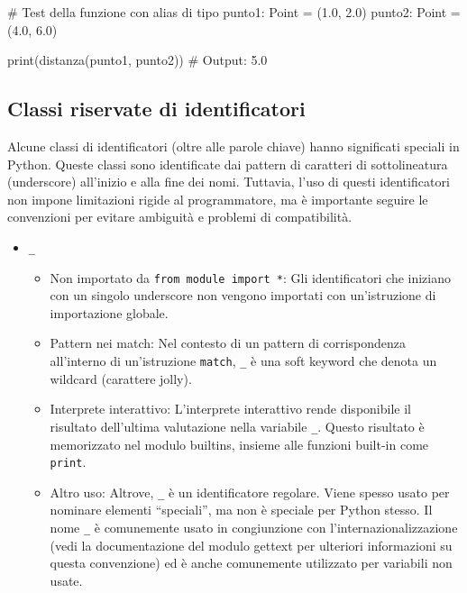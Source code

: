 \documentclass[
  letterpaper,
]{scrbook}
\newenvironment{Shaded}{\begin{snugshade}}{\end{snugshade}}
\newcommand{\BuiltInTok}[1]{\textcolor[rgb]{0.00,0.23,0.31}{#1}}
\newcommand{\CommentTok}[1]{\textcolor[rgb]{0.37,0.37,0.37}{#1}}
\newcommand{\FloatTok}[1]{\textcolor[rgb]{0.68,0.00,0.00}{#1}}
\newcommand{\NormalTok}[1]{\textcolor[rgb]{0.00,0.23,0.31}{#1}}
\newcommand{\OperatorTok}[1]{\textcolor[rgb]{0.37,0.37,0.37}{#1}}
\providecommand{\tightlist}{%
  \setlength{\itemsep}{0pt}\setlength{\parskip}{0pt}}\usepackage{longtable,booktabs,array}
\begin{document}
\begin{itemize}
\begin{Shaded}
\begin{Highlighting}[]
\CommentTok{\# Test della funzione con alias di tipo}
\NormalTok{punto1: Point }\OperatorTok{=}\NormalTok{ (}\FloatTok{1.0}\NormalTok{, }\FloatTok{2.0}\NormalTok{) }
\NormalTok{punto2: Point }\OperatorTok{=}\NormalTok{ (}\FloatTok{4.0}\NormalTok{, }\FloatTok{6.0}\NormalTok{)}

\BuiltInTok{print}\NormalTok{(distanza(punto1, punto2))  }\CommentTok{\# Output: 5.0}
\end{Highlighting}
\end{Shaded}
\end{itemize}

\subsection{Classi riservate di
identificatori}\label{classi-riservate-di-identificatori}

Alcune classi di identificatori (oltre alle parole chiave) hanno
significati speciali in Python. Queste classi sono identificate dai
pattern di caratteri di sottolineatura (underscore) all'inizio e alla
fine dei nomi. Tuttavia, l'uso di questi identificatori non impone
limitazioni rigide al programmatore, ma è importante seguire le
convenzioni per evitare ambiguità e problemi di compatibilità.

\begin{itemize}
\tightlist
\item
  \texttt{\_}

  \begin{itemize}
  \tightlist
  \item
    Non importato da \texttt{from\ module\ import\ *}: Gli
    identificatori che iniziano con un singolo underscore non vengono
    importati con un'istruzione di importazione globale.
  \item
    Pattern nei match: Nel contesto di un pattern di corrispondenza
    all'interno di un'istruzione \texttt{match}, \texttt{\_} è una soft
    keyword che denota un wildcard (carattere jolly).
  \item
    Interprete interattivo: L'interprete interattivo rende disponibile
    il risultato dell'ultima valutazione nella variabile \texttt{\_}.
    Questo risultato è memorizzato nel modulo builtins, insieme alle
    funzioni built-in come \texttt{print}.
  \item
    Altro uso: Altrove, \texttt{\_} è un identificatore regolare. Viene
    spesso usato per nominare elementi ``speciali'', ma non è speciale
    per Python stesso. Il nome \texttt{\_} è comunemente usato in
    congiunzione con l'internazionalizzazione (vedi la documentazione
    del modulo gettext per ulteriori informazioni su questa convenzione)
    ed è anche comunemente utilizzato per variabili non usate.
  \end{itemize}
\end{itemize}
\end{document}

